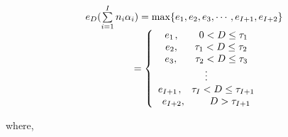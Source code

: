 \documentclass[a4paper]{article}
\begin{document}
\begin{equation}
\begin{array}{l}
{e_D}(\sum\limits_{i = 1}^I {{n_i}{\alpha _i}} ) = \max \{ {e_1},{e_2},{e_3}, \cdots ,{e_{I + 1}},{e_{I + 2}}\} \\
{\kern 1pt} {\kern 1pt} {\kern 1pt} {\kern 1pt} {\kern 1pt} {\kern 1pt} {\kern 1pt} {\kern 1pt} {\kern 1pt} {\kern 1pt} {\kern 1pt} {\kern 1pt} {\kern 1pt} {\kern 1pt} {\kern 1pt} {\kern 1pt} {\kern 1pt} {\kern 1pt} {\kern 1pt} {\kern 1pt} {\kern 1pt} {\kern 1pt} {\kern 1pt} {\kern 1pt} {\kern 1pt} {\kern 1pt} {\kern 1pt} {\kern 1pt} {\kern 1pt} {\kern 1pt} {\kern 1pt} {\kern 1pt} {\kern 1pt} {\kern 1pt} {\kern 1pt} {\kern 1pt} {\kern 1pt} {\kern 1pt} {\kern 1pt} {\kern 1pt} {\kern 1pt} {\kern 1pt} {\kern 1pt} {\kern 1pt} {\kern 1pt} {\kern 1pt}  = \left\{ {\begin{array}{*{20}{c}}
{{e_1}{\kern 1pt} ,{\kern 1pt} {\kern 1pt} {\kern 1pt} {\kern 1pt} {\kern 1pt} {\kern 1pt} {\kern 1pt} {\kern 1pt} {\kern 1pt} {\kern 1pt} {\kern 1pt} {\kern 1pt} {\kern 1pt} {\kern 1pt} {\kern 1pt} {\kern 1pt} {\kern 1pt} {\kern 1pt} {\kern 1pt} {\kern 1pt} 0 < D \le {\tau _1}}\\
{{e_2},{\kern 1pt} {\kern 1pt} {\kern 1pt} {\kern 1pt} {\kern 1pt} {\kern 1pt} {\kern 1pt} {\kern 1pt} {\kern 1pt} {\kern 1pt} {\kern 1pt} {\kern 1pt} {\kern 1pt} {\kern 1pt} {\kern 1pt} {\kern 1pt} {\tau _1} < D \le {\tau _2}}\\
{{e_3},{\kern 1pt} {\kern 1pt} {\kern 1pt} {\kern 1pt} {\kern 1pt} {\kern 1pt} {\kern 1pt} {\kern 1pt} {\kern 1pt} {\kern 1pt} {\kern 1pt} {\kern 1pt} {\kern 1pt} {\kern 1pt} {\kern 1pt} {\kern 1pt} {\kern 1pt} {\tau _2} < D \le {\tau _3}}\\
 \vdots \\
{{e_{I + 1}}{\kern 1pt} ,{\kern 1pt} {\kern 1pt} {\kern 1pt} {\kern 1pt} {\kern 1pt} {\kern 1pt} {\kern 1pt} {\kern 1pt} {\kern 1pt} {\tau _I} < D \le {\tau _{I + 1}}}\\
{{e_{I + 2}},{\kern 1pt} {\kern 1pt} {\kern 1pt} {\kern 1pt} {\kern 1pt} {\kern 1pt} {\kern 1pt} {\kern 1pt} {\kern 1pt} {\kern 1pt} {\kern 1pt} {\kern 1pt} {\kern 1pt} {\kern 1pt} {\kern 1pt} {\kern 1pt} {\kern 1pt} {\kern 1pt} {\kern 1pt} {\kern 1pt} {\kern 1pt} {\kern 1pt} {\kern 1pt} {\kern 1pt} D > {\tau _{I + 1}}}
\end{array}} \right.
\end{array}
\label{eq:2.7}
\end{equation}

where,
\end{document}
